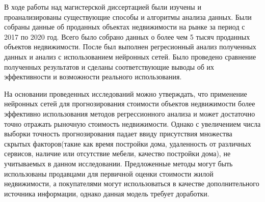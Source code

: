 


В ходе работы над магистерской диссертацией были изучены и проанализированы существующие способы и алгоритмы анализа
данных. Были собраны данные об проданных объектах недвижимости на рынке за период с 2017 по 2020 год.
Всего было собрано данных о более чем 5 тысяч проданных объектов недвижимости. После был выполнен регресионный анализ
полученных данных и анализ с использованием нейронных сетей. Было проведено сравнение полученных результатов и сделаны
соответствующие выводы об их эффективности и возможности реального использования.

На основании проведенных исследований можно утверждать, что применение нейронных сетей для прогнозирования
стоимости объектов недвижимости более эффективно использования методов регрессионного анализа и может достаточно
точно отражать рыночную стоимость недвижимости. Однако с увеличением числа выборки точность прогнозирования падает ввиду
присутствия множества скрытых факторов(такие как время постройки дома, удаленность от различных сервисов, наличие или
отсутствие мебели, качество постройки дома), не учитываемых в данном исследовании.
Предложенные методы могут быть использованы продавцами для первичной оценки стоимости жилой недвижимости,
а покупателями могут использоваться в качестве дополнительного источника информации, однако данная модель требует
доработки.
